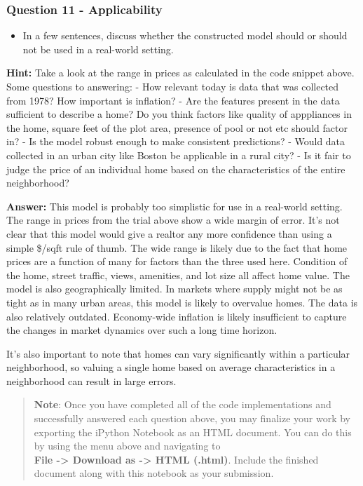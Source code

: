 \documentclass[11pt]{article}
\providecommand{\tightlist}{%
      \setlength{\itemsep}{0pt}\setlength{\parskip}{0pt}}
\begin{document}
    \subsubsection{Question 11 -
Applicability}\label{question-11---applicability}

\begin{itemize}
\tightlist
\item
  In a few sentences, discuss whether the constructed model should or
  should not be used in a real-world setting.
\end{itemize}

\textbf{Hint:} Take a look at the range in prices as calculated in the
code snippet above. Some questions to answering: - How relevant today is
data that was collected from 1978? How important is inflation? - Are the
features present in the data sufficient to describe a home? Do you think
factors like quality of apppliances in the home, square feet of the plot
area, presence of pool or not etc should factor in? - Is the model
robust enough to make consistent predictions? - Would data collected in
an urban city like Boston be applicable in a rural city? - Is it fair to
judge the price of an individual home based on the characteristics of
the entire neighborhood?

    \textbf{Answer: } This model is probably too simplistic for use in a
real-world setting. The range in prices from the trial above show a wide
margin of error. It's not clear that this model would give a realtor any
more confidence than using a simple \$/sqft rule of thumb. The wide
range is likely due to the fact that home prices are a function of many
for factors than the three used here. Condition of the home, street
traffic, views, amenities, and lot size all affect home value. The model
is also geographically limited. In markets where supply might not be as
tight as in many urban areas, this model is likely to overvalue homes.
The data is also relatively outdated. Economy-wide inflation is likely
insufficient to capture the changes in market dynamics over such a long
time horizon.

It's also important to note that homes can vary significantly within a
particular neighborhood, so valuing a single home based on average
characteristics in a neighborhood can result in large errors.

    \begin{quote}
\textbf{Note}: Once you have completed all of the code implementations
and successfully answered each question above, you may finalize your
work by exporting the iPython Notebook as an HTML document. You can do
this by using the menu above and navigating to\\
\textbf{File -\textgreater{} Download as -\textgreater{} HTML (.html)}.
Include the finished document along with this notebook as your
submission.
\end{quote}


    
    
    
    
\end{document}
